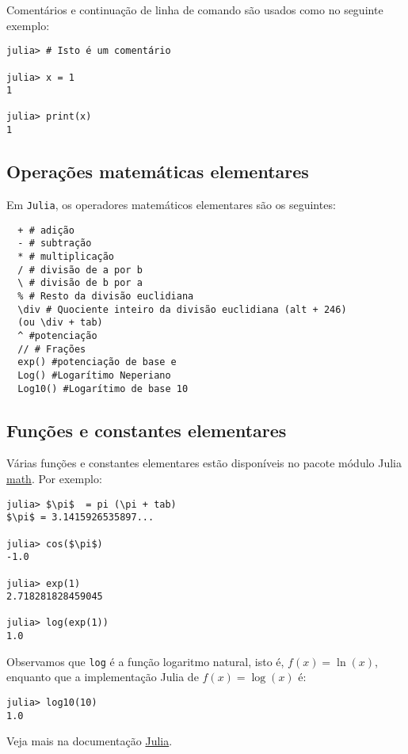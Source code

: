 Comentários e continuação de linha de comando são usados como no seguinte exemplo:

\begin{lstlisting}
julia> # Isto é um comentário

julia> x = 1
1

julia> print(x)
1
\end{lstlisting}

\subsection{Operações matemáticas elementares}

Em \verb+Julia+, os operadores matemáticos elementares são os seguintes:
\begin{lstlisting}
  + # adição
  - # subtração
  * # multiplicação
  / # divisão de a por b
  \ # divisão de b por a
  % # Resto da divisão euclidiana
  \div # Quociente inteiro da divisão euclidiana (alt + 246)
  (ou \div + tab)
  ^ #potenciação
  // # Frações
  exp() #potenciação de base e
  Log() #Logarítimo Neperiano
  Log10() #Logarítimo de base 10
\end{lstlisting}

\subsection{Funções e constantes elementares}

Várias funções e constantes elementares estão disponíveis no pacote módulo Julia \href{https://docs.Julia.org/3/library/math.html?highlight=math#module-math}{math}. Por exemplo:
\begin{lstlisting}[mathescape=true]
julia> $\pi$  = pi (\pi + tab)
$\pi$ = 3.1415926535897...

julia> cos($\pi$)
-1.0

julia> exp(1)
2.718281828459045

julia> log(exp(1))
1.0
\end{lstlisting}

Observamos que \verb+log+ é a função logaritmo natural, isto é, $f(x) = \ln(x)$, enquanto que a implementação Julia de $f(x) = \log(x)$ é:

\begin{lstlisting}
julia> log10(10)
1.0
\end{lstlisting}

Veja mais na documentação \href{https://julia-doc-pt-br.readthedocs.io/en/latest/manual/mathematical-operations.html}{Julia}.

